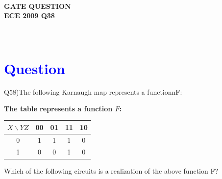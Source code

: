 \documentclass[a4paper,12pt]{article}
\begin{document}
\pagestyle{empty} %

\thispagestyle{fancy} %
\fancyhf{} %
\renewcommand{\headrulewidth}{0pt} %


\vspace{1cm}
\begin{center}

    {\LARGE \textbf{\textcolor{darkskyblue}{\\  GATE QUESTION \\ ECE 2009 Q38}}}
\end{center}

\vspace{-1cm} %
\section*{\textcolor{blue}{\\Question}}
Q58)The following Karnaugh map represents a functionnF:
\vspace{1cm}
\noindent
\begin{center}
\textbf{The table represents a function \( F \):}
\end{center}
\vspace{1cm}
\noindent
\begin{center}
\begin{tabular}{|c|c|c|c|c|}
\hline
\( X \backslash YZ \) & 00 & 01 & 11 & 10 \\
\hline
0 & 1 & 1 & 1 & 0 \\
\hline
1 & 0 & 0 & 1 & 0 \\
\hline
\end{tabular}
\end{center}

\vspace{0.5em}
Which of the following circuits is a realization of the above function F?
\end{document}
